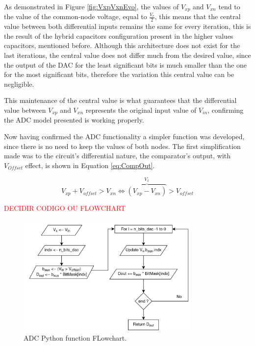 As demonstrated in Figure \ref{fig:VxpVxnEvo}, the values of $V_{xp}$ and $V_{xn}$ tend to the value of the common-node voltage, equal to $\frac{V_r}{2}$, this means that the central value between both differential inputs remains the same for every iteration, this is the result of the hybrid capacitors configuration present in the higher values capacitors, mentioned before. Although this architecture does not exist for the last iterations, the central value does not differ much from the desired value, since the output of the DAC for the least significant bits is much smaller than the one for the most significant bits, therefore the variation this central value can be negligible.

This maintenance of the central value is what guarantees that the differential value between $V_{xp}$ and $V_{xn}$ represents the original input value of $V_{in}$, confirming the ADC model presented is working properly.

Now having confirmed the ADC functionality a simpler function was developed, since there is no need to keep the values of both nodes.
The first simplification made was to the circuit's differential nature, the comparator's output, with $V_{Offset}$ effect, is shown in Equation \ref{eq:CompOut}.

\begin{equation}
    V_{xp} + V_{offset} > V_{xn} \Leftrightarrow \overbrace{( V_{xp} - V_{xn} )}^{V_x} > V_{offset} 
    \label{eq:CompOut}
\end{equation}

\textcolor{red}{DECIDIR CODIGO OU FLOWCHART}


\begin{figure}[h]

    \centering
    \includegraphics*[width=0.8\textwidth]{Images/ADCPythonFlowChart.png}
    \caption{ADC Python function FLowchart.}

    \label{fig:ADCFlowChart}
\end{figure}

